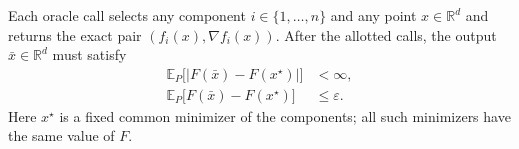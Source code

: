 \documentclass[10pt]{article}
\theoremstyle{definition}
\begin{document}
Each oracle call selects any component $i\in\{1,\ldots,n\}$ and any point $x\in\mathbb{R}^d$ and returns the exact pair $(f_i(x),\nabla f_i(x))$. After the allotted calls, the output $\bar{x}\in\mathbb{R}^d$ must satisfy
\[
\begin{aligned}
\mathbb{E}_P\bigl[|F(\bar{x})-F(x^\star)|\bigr]&<\infty,\\
\mathbb{E}_P\bigl[F(\bar{x})-F(x^\star)\bigr]&\leq\varepsilon.
\end{aligned}
\]
Here $x^\star$ is a fixed common minimizer of the components; all such minimizers have the same value of $F$.
\end{document}
